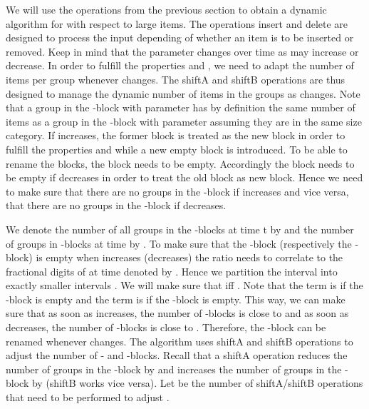 We will use the operations from the previous section to obtain a dynamic algorithm for \BP with respect to large items. The operations insert and delete are designed to process the input depending of whether an item is to be inserted or removed. Keep in mind that the parameter  changes over time as  may increase or decrease. In order to fulfill the properties  and , we need to adapt the number of items per group whenever  changes. The shiftA and shiftB operations are thus designed to manage the dynamic number of items in the groups as  changes.
Note that a group in the -block with parameter  has by definition the same number of items as a group in the -block with parameter  assuming they are in the same size category. If  increases, the former  block is treated as the new  block in order to fulfill the properties  and  while a new empty  block is introduced. To be able to rename the blocks, the  block needs to be empty. Accordingly the  block needs to be empty if  decreases in order to treat the old  block as new  block. Hence we need to make sure that there are no groups in the -block if  increases and vice versa, that there are no groups in the -block if  decreases.

We denote the number of all groups in the -blocks at time t by  and the number of groups in -blocks at time  by . To make sure that the -block (respectively the -block) is empty when  increases (decreases) the ratio  needs to correlate to the fractional digits of  at time  denoted by . Hence we partition the interval  into exactly  smaller intervals . We will make sure that  iff . Note that the term  is  if the -block is empty and the term is  if the -block is empty. This way, we can make sure that as soon as  increases, the number of -blocks is close to  and as soon as  decreases, the number of -blocks is close to . Therefore, the -block can be renamed whenever  changes. The algorithm uses shiftA and shiftB operations to adjust the number of - and -blocks. Recall that a shiftA operation reduces the number of groups in the -block by  and increases the number of groups in the -block by  (shiftB works vice versa). Let  be the number of shiftA/shiftB operations that need to be performed to adjust . 



